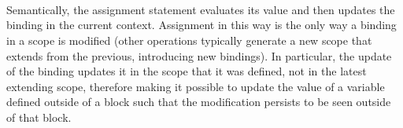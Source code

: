 \begin{bnf*}
     \\
     \\
     \\
     \\
     \\
     \\
    \bnfmore{
        \bnfts{<>=}\bnfor
        \bnfts{:=}\bnfor
        \bnfts{|=}\bnfor
        \bnfts{\&=}\bnfor
        \bnfts{\textasciicircum=}\bnfor
        \bnfts{<\textasciitilde=}\bnfor
        \bnfts{\textasciitilde>=}\bnfor
    } \\
    \bnfmore{
        \bnfts{<\textasciitilde\textasciitilde=}\bnfor
        \bnfts{\textasciitilde\textasciitilde>=}\bnfor
        \bnfts{<<\textasciitilde=}\bnfor
        \bnfts{\textasciitilde>>=}\bnfor
    } \\
\end{bnf*}

Semantically, the assignment statement evaluates its value and then updates
the binding in the current context. Assignment in this way is the only way
a binding in a scope is modified (other operations typically generate a new scope
that extends from the previous, introducing new bindings). In particular, the
update of the binding updates it in the scope that it was defined, not in the
latest extending scope, therefore making it possible to update the value of a
variable defined outside of a block such that the modification persists to be
seen outside of that block.

\begin{prooftree}
\end{prooftree}

